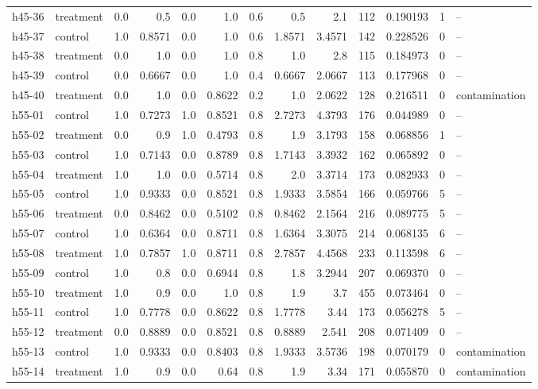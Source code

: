 \documentclass[11pt,a4paper]{article}
\begin{document}
\begin{footnotesize}
\begin{longtable}{llrrrrrrrrrrl}
h45-36 & treatment & 0.0 & 0.5 & 0.0 & 1.0 & 0.6 & 0.5 & 2.1 & 112 & 0.190193 & 1 & -- \\
h45-37 & control & 1.0 & 0.8571 & 0.0 & 1.0 & 0.6 & 1.8571 & 3.4571 & 142 & 0.228526 & 0 & -- \\
h45-38 & treatment & 0.0 & 1.0 & 0.0 & 1.0 & 0.8 & 1.0 & 2.8 & 115 & 0.184973 & 0 & -- \\
h45-39 & control & 0.0 & 0.6667 & 0.0 & 1.0 & 0.4 & 0.6667 & 2.0667 & 113 & 0.177968 & 0 & -- \\
h45-40 & treatment & 0.0 & 1.0 & 0.0 & 0.8622 & 0.2 & 1.0 & 2.0622 & 128 & 0.216511 & 0 & contamination \\
h55-01 & control & 1.0 & 0.7273 & 1.0 & 0.8521 & 0.8 & 2.7273 & 4.3793 & 176 & 0.044989 & 0 & -- \\
h55-02 & treatment & 0.0 & 0.9 & 1.0 & 0.4793 & 0.8 & 1.9 & 3.1793 & 158 & 0.068856 & 1 & -- \\
h55-03 & control & 1.0 & 0.7143 & 0.0 & 0.8789 & 0.8 & 1.7143 & 3.3932 & 162 & 0.065892 & 0 & -- \\
h55-04 & treatment & 1.0 & 1.0 & 0.0 & 0.5714 & 0.8 & 2.0 & 3.3714 & 173 & 0.082933 & 0 & -- \\
h55-05 & control & 1.0 & 0.9333 & 0.0 & 0.8521 & 0.8 & 1.9333 & 3.5854 & 166 & 0.059766 & 5 & -- \\
h55-06 & treatment & 0.0 & 0.8462 & 0.0 & 0.5102 & 0.8 & 0.8462 & 2.1564 & 216 & 0.089775 & 5 & -- \\
h55-07 & control & 1.0 & 0.6364 & 0.0 & 0.8711 & 0.8 & 1.6364 & 3.3075 & 214 & 0.068135 & 6 & -- \\
h55-08 & treatment & 1.0 & 0.7857 & 1.0 & 0.8711 & 0.8 & 2.7857 & 4.4568 & 233 & 0.113598 & 6 & -- \\
h55-09 & control & 1.0 & 0.8 & 0.0 & 0.6944 & 0.8 & 1.8 & 3.2944 & 207 & 0.069370 & 0 & -- \\
h55-10 & treatment & 1.0 & 0.9 & 0.0 & 1.0 & 0.8 & 1.9 & 3.7 & 455 & 0.073464 & 0 & -- \\
h55-11 & control & 1.0 & 0.7778 & 0.0 & 0.8622 & 0.8 & 1.7778 & 3.44 & 173 & 0.056278 & 5 & -- \\
h55-12 & treatment & 0.0 & 0.8889 & 0.0 & 0.8521 & 0.8 & 0.8889 & 2.541 & 208 & 0.071409 & 0 & -- \\
h55-13 & control & 1.0 & 0.9333 & 0.0 & 0.8403 & 0.8 & 1.9333 & 3.5736 & 198 & 0.070179 & 0 & contamination \\
h55-14 & treatment & 1.0 & 0.9 & 0.0 & 0.64 & 0.8 & 1.9 & 3.34 & 171 & 0.055870 & 0 & contamination \\

\end{longtable}
\end{footnotesize}
\end{document}
